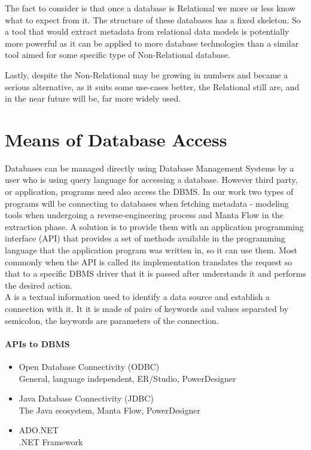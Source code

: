 The fact to consider is that once a database is Relational we more or less know what to expect from it. The structure of these databases has a fixed skeleton. So a tool that would extract metadata from relational data models is potentially more powerful as it can be applied to more database technologies than a similar tool aimed for some specific type of Non-Relational database. 

Lastly, despite the Non-Relational may be growing in numbers and became a serious alternative, as it suits some use-cases better, the Relational still are, and in the near future will be, far more widely used.

\section{Means of Database Access}

Databases can be managed directly using Database Management Systems by a user who is using query language for accessing a database. 
However third party, or application, programs need also access the DBMS. 
In our work two types of programs will be connecting to databases when fetching metadata - modeling tools when undergoing a reverse-engineering process and Manta Flow in the extraction phase.
A solution is to provide them with an application programming interface (API) that provides a set of methods available in the programming language that the application program was written in, so it can use them.
Most commonly when the API is called its implementation translates the request so that to a specific DBMS driver that it is passed after understands it and performs the desired action. \\

A  is a textual information used to identify a data source and establish a connection with it. It it is made of pairs of keywords and values separated by semicolon, the keywords are parameters of the connection.

\paragraph{APIs to DBMS}
\begin{itemize}
	\item Open Database Connectivity (ODBC)\\
		General, language independent, ER/Studio, PowerDesigner
	\item Java Database Connectivity (JDBC)\\
		The Java ecosystem, Manta Flow, PowerDesigner
	\item ADO.NET\\
		.NET Framework
\end{itemize}
